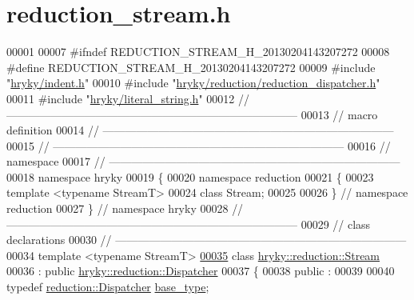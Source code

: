 \hypertarget{reduction__stream_8h_source}{\section{reduction\-\_\-stream.\-h}
}

\begin{DoxyCode}
00001 
00007 \textcolor{preprocessor}{#ifndef REDUCTION\_STREAM\_H\_20130204143207272}
00008 \textcolor{preprocessor}{}\textcolor{preprocessor}{#define REDUCTION\_STREAM\_H\_20130204143207272}
00009 \textcolor{preprocessor}{}\textcolor{preprocessor}{#include "\hyperlink{indent_8h}{hryky/indent.h}"}
00010 \textcolor{preprocessor}{#include "\hyperlink{reduction__dispatcher_8h}{hryky/reduction/reduction_dispatcher.h}"}
00011 \textcolor{preprocessor}{#include "\hyperlink{literal__string_8h}{hryky/literal_string.h}"}
00012 \textcolor{comment}{//
      ------------------------------------------------------------------------------}
00013 \textcolor{comment}{// macro definition}
00014 \textcolor{comment}{//
      ------------------------------------------------------------------------------}
00015 \textcolor{comment}{//
      ------------------------------------------------------------------------------}
00016 \textcolor{comment}{// namespace}
00017 \textcolor{comment}{//
      ------------------------------------------------------------------------------}
00018 \textcolor{keyword}{namespace }hryky
00019 \{
00020 \textcolor{keyword}{namespace }reduction
00021 \{
00023     \textcolor{keyword}{template} <\textcolor{keyword}{typename} StreamT>
00024     \textcolor{keyword}{class }Stream;
00025 
00026 \} \textcolor{comment}{// namespace reduction}
00027 \} \textcolor{comment}{// namespace hryky}
00028 \textcolor{comment}{//
      ------------------------------------------------------------------------------}
00029 \textcolor{comment}{// class declarations}
00030 \textcolor{comment}{//
      ------------------------------------------------------------------------------}
00034 \textcolor{comment}{}\textcolor{keyword}{template} <\textcolor{keyword}{typename} StreamT>
\hypertarget{reduction__stream_8h_source_l00035}{}\hyperlink{classhryky_1_1reduction_1_1_stream}{00035} \textcolor{keyword}{class }\hyperlink{classhryky_1_1reduction_1_1_stream}{hryky::reduction::Stream}
00036     : \textcolor{keyword}{public} \hyperlink{classhryky_1_1reduction_1_1_dispatcher}{hryky::reduction::Dispatcher}
00037 \{
00038 \textcolor{keyword}{public} :
00039 
00040     \textcolor{keyword}{typedef} \hyperlink{classhryky_1_1reduction_1_1_dispatcher}{reduction::Dispatcher} \hyperlink{classhryky_1_1reduction_1_1_dispatcher}{base_type};

\end{DoxyCode}
